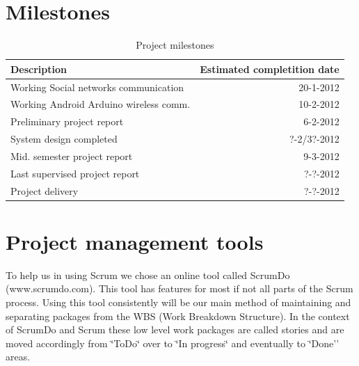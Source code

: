 \section{Milestones}
\begin{table}
	\begin{center}
		\caption{Project milestones}
		\begin{tabular}{| l | r |}
			\hline

\textbf{Description} & \textbf{Estimated completition date} \\
\hline

Working Social networks communication & 20-1-2012 \\
\hline

Working Android Arduino wireless comm. & 10-2-2012 \\
\hline

Preliminary project report & 6-2-2012 \\
\hline

System design completed & ?-2/3?-2012 \\
\hline

Mid. semester project report & 9-3-2012 \\
\hline

Last supervised project report & ?-?-2012 \\
\hline

Project delivery & ?-?-2012 \\
\hline

		\end{tabular}
	\end{center}
\label{table:milestone}
\end{table}

\newpage
\section{Project management tools}

To help us in using Scrum we chose an online tool called ScrumDo (www.scrumdo.com).
This tool has features for most if not all parts of the Scrum process. Using this tool
consistently will be our main method of maintaining and separating packages from
the WBS (Work Breakdown Structure). In the context of ScrumDo and
Scrum these low level work packages are called stories and are moved
accordingly from \char`\"{}ToDo\char`\"{} over to \char`\"{}In progress\char`\"{}
and eventually to \char`\"{}Done'' areas.
	
